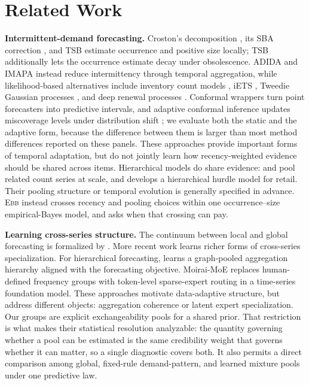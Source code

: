 \documentclass[twoside]{article}
\theoremstyle{definition}
\newcommand{\EBB}{\textsc{Ebb}}
\begin{document}
\section{Related Work}\label{sec:related}

\textbf{Intermittent-demand forecasting.} Croston's decomposition
\citep{croston1972}, its SBA correction \citep{syntetos2005accuracy}, and
TSB \citep{teunter2011} estimate occurrence and positive size locally;
TSB additionally lets the occurrence estimate decay under obsolescence.
ADIDA \citep{nikolopoulos2011} and IMAPA \citep{kourentzes2016} instead
reduce intermittency through temporal aggregation, while likelihood-based
alternatives include inventory count models \citep{snyder2012}, iETS
\citep{svetunkov2023iets}, Tweedie Gaussian processes \citep{damato2025},
and deep renewal processes \citep{turkmen2019}. Conformal wrappers turn
point forecasters into predictive intervals, and adaptive conformal
inference updates miscoverage levels under distribution shift
\citep{gibbs2021}; we evaluate both the static and the adaptive form,
because the difference between them is larger than most method
differences reported on these panels. These approaches provide important
forms of temporal adaptation, but do not jointly learn how
recency-weighted evidence should be shared across items. Hierarchical
models do share evidence: \citet{chapados2014} and \citet{seeger2016}
pool related count series at scale, and \citet{pitkin2024} develops a
hierarchical hurdle model for retail. Their pooling structure or temporal
evolution is generally specified in advance. \EBB{} instead crosses
recency and pooling choices within one occurrence--size empirical-Bayes
model, and asks when that crossing can pay.

\textbf{Learning cross-series structure.} The continuum between local and
global forecasting is formalized by \citet{monteromanso2021}. More recent
work learns richer forms of cross-series specialization. For hierarchical
forecasting, \citet{cini2024} learns a graph-pooled aggregation hierarchy
aligned with the forecasting objective. Moirai-MoE \citep{liu2025moirai}
replaces human-defined frequency groups with token-level sparse-expert
routing in a time-series foundation model. These approaches motivate
data-adaptive structure, but address different objects: aggregation
coherence or latent expert specialization. Our groups are explicit
exchangeability pools for a shared prior. That restriction is what makes
their statistical resolution analyzable: the quantity governing whether a
pool can be estimated is the same credibility weight that governs whether
it can matter, so a single diagnostic covers both. It also permits a
direct comparison among global, fixed-rule demand-pattern, and learned
mixture pools under one predictive law.
\end{document}
